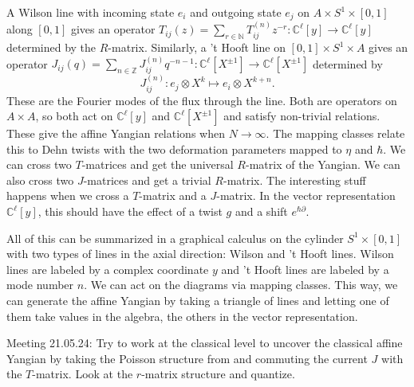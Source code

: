 \documentclass[11pt]{report}
\theoremstyle{definition}
\theoremstyle{remark}
\theoremstyle{remark}
\newcommand{\N}{\mathbb{N}}
\newcommand{\Z}{\mathbb{Z}}
\newcommand{\C}{\mathbb{C}}
\begin{document}
A Wilson line with incoming state $e_i$ and outgoing state $e_j$ on $A \times S^1 \times [0,1]$ along $[0,1]$ gives an operator $T_{ij}(z) = \sum_{r \in \N} T_{ij}^{(n)} z^{-r}: \C^\ell[y] \to \C^\ell[y]$ determined by the $R$-matrix. Similarly, a 't Hooft line on $[0,1] \times S^1 \times A$ gives an operator $J_{ij}(q) = \sum_{n \in \Z} J_{ij}^{(n)} q^{-n-1}: \C^\ell[X^{\pm 1}] \to \C^\ell[X^{\pm 1}]$ determined by
\begin{equation*}
J_{ij}^{(n)}: e_j \otimes X^k \mapsto e_i \otimes X^{k+n}.
\end{equation*}
These are the Fourier modes of the flux through the line. Both are operators on $A \times A$, so both act on $\C^\ell[y]$ and $\C^\ell[X^{\pm 1}]$ and satisfy non-trivial relations. These give the affine Yangian relations when $N \to \infty$. The mapping classes relate this to Dehn twists with the two deformation parameters mapped to $\eta$ and $\hbar$. We can cross two $T$-matrices and get the universal $R$-matrix of the Yangian. We can also cross two $J$-matrices and get a trivial $R$-matrix. The interesting stuff happens when we cross a $T$-matrix and a $J$-matrix. In the vector representation $\C^\ell[y]$, this should have the effect of a twist $g$ and a shift $e^{\hbar \partial}$.

All of this can be summarized in a graphical calculus on the cylinder $S^1 \times [0,1]$ with two types of lines in the axial direction: Wilson and 't Hooft lines. Wilson lines are labeled by a complex coordinate $y$ and 't Hooft lines are labeled by a mode number $n$. We can act on the diagrams via mapping classes. This way, we can generate the affine Yangian by taking a triangle of lines and letting one of them take values in the algebra, the others in the vector representation.

Meeting 21.05.24: Try to work at the classical level to uncover the classical affine Yangian by taking the Poisson structure from \cite{article:arutyunov:1998} and commuting the current $J$ with the $T$-matrix. Look at the $r$-matrix structure and quantize.
\end{document}
